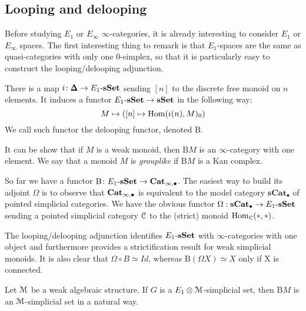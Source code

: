 \begin{refsection}
\section{Looping and delooping}

Before studying $E_1$ or $E_{\infty}$ $\infty$-categories, it is already interesting to consider $E_1$ or $E_{\infty}$ spaces. The first interesting thing to remark is that $E_1$-spaces are the same as quasi-categories with only one 0-simplex, so that it is particularly easy to construct the looping/delooping adjunction.

\begin{definition}
There is a map $i \colon \pmb{\Delta}\to E_1 \textrm{-} \mathbf{s\,\!\mathbf{Set}}$ sending $[n]$ to the discrete free monoid on $n$ elements. It induces a functor $E_1 \textrm{-} \mathbf{s\,\!\mathbf{Set}} \to \mathbf{s\,\!\mathbf{Set}}$ in the following way:
\[
M \mapsto ([n] \mapsto \mathrm{Hom}(i(n),M)_0 )
\]
We call such functor the delooping functor, denoted $\mathrm{B}$.
\end{definition}

\begin{proposition}
It can be show that if $M$ is a weak monoid, then $\mathrm{B}M$ is an $\infty$-category with one element. We say that a monoid $M$ is \emph{grouplike} if $\mathrm{B}M$ is a Kan complex.
\end{proposition}

\begin{remark}
So far we have a functor $\mathrm{B} \colon E_1 \textrm{-} \mathbf{s\,\!\mathbf{Set}} \to \mathbf{Cat}_{\infty,\bullet}$. The easiest way to build its adjoint $\Omega$ is to observe that $\mathbf{Cat}_{\infty, \bullet}$ is equivalent to the model category $\mathbf{sCat}_{\bullet}$ of pointed simplicial categories. We have the obvious functor $\Omega: \mathbf{sCat}_{\bullet} \to E_1\textrm{-} \mathbf{s\,\!\mathbf{Set}}$ sending a
pointed simplicial category $\mathcal{C}$ to the (strict) monoid $\mathrm{Hom}_{\mathcal{C}}(*,*)$.
\end{remark}

The looping/delooping adjunction identifies $E_1 \textrm{-} \mathbf{s\,\!\mathbf{Set}}$ with $\infty$-categories with one object and furthermore provides a strictification result for weak simplicial monoids. It is also clear that $\Omega \circ B \simeq Id$, whereas $\mathrm{B}(\Omega X) \simeq X$ only if X is connected.

\begin{proposition}
Let $\mathcal{M}$ be a weak algebraic structure. If $G$ is a $E_1 \otimes \mathcal{M}$-simplicial set, then $\mathrm{B} M$ is an $\mathcal{M}$-simplicial set in a natural way.
\end{proposition}


\end{refsection}
